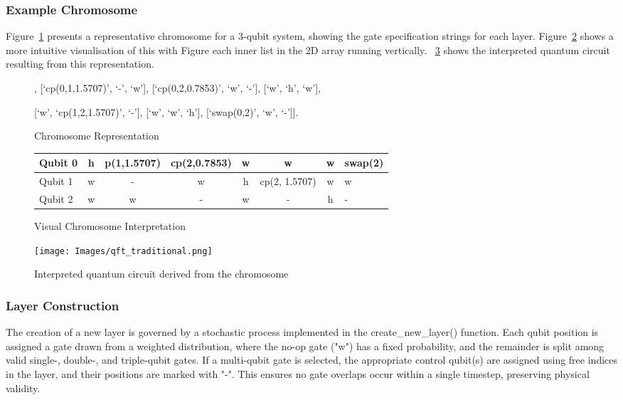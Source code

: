 \documentclass[11pt,a4paper]{article}
\begin{document}
\subsubsection*{Example Chromosome} Figure~\ref{fig:chromosome_example} presents a representative chromosome for a 3-qubit system, showing the gate specification strings for each layer. Figure~\ref{fig:chromosome_matrix} shows a more intuitive visualisation of this with Figure each inner list in the 2D array running vertically. ~\ref{fig:chromosome_circuit} shows the interpreted quantum circuit resulting from this representation.

\begin{figure}[H]
    \centering
    [[‘h’, ‘w’, ‘w’], [‘cp(0,1,1.5707)’, ‘-’, ‘w’], [‘cp(0,2,0.7853)’, ‘w’, ‘-’], [‘w’, ‘h’, ‘w’],
    
    [‘w’, ‘cp(1,2,1.5707)’, ‘-’], [‘w’, ‘w’, ‘h’], [‘swap(0,2)’, ‘w’, ‘-’]].
    \caption{Chromosome Representation}
    \label{fig:chromosome_example}
\end{figure}

\begin{figure}[H]
    \centering
    \begin{tabular}{l | c c c c c c l}
        \toprule
        Qubit 0 & h & p(1,1.5707) & cp(2,0.7853) & w & w & w & swap(2) \\
        \midrule
        Qubit 1 & w & - & w & h & cp(2, 1.5707) & w & w\\
        \midrule
        Qubit 2 & w & w & - & w & - & h & - \\
        \bottomrule
    \end{tabular}
    \caption{Visual Chromosome Interpretation}
    \label{fig:chromosome_matrix}
\end{figure}

\begin{figure}[H]
    \centering
    \texttt{[image: Images/qft\_traditional.png]}
    \caption{Interpreted quantum circuit derived from the chromosome}
    \label{fig:chromosome_circuit}
\end{figure}

\subsubsection*{Layer Construction}
The creation of a new layer is governed by a stochastic process implemented in the create\_new\_layer() function. Each qubit position is assigned a gate drawn from a weighted distribution, where the no-op gate ("w") has a fixed probability, and the remainder is split among valid single-, double-, and triple-qubit gates. If a multi-qubit gate is selected, the appropriate control qubit(s) are assigned using free indices in the layer, and their positions are marked with "-". This ensures no gate overlaps occur within a single timestep, preserving physical validity.
\end{document}
